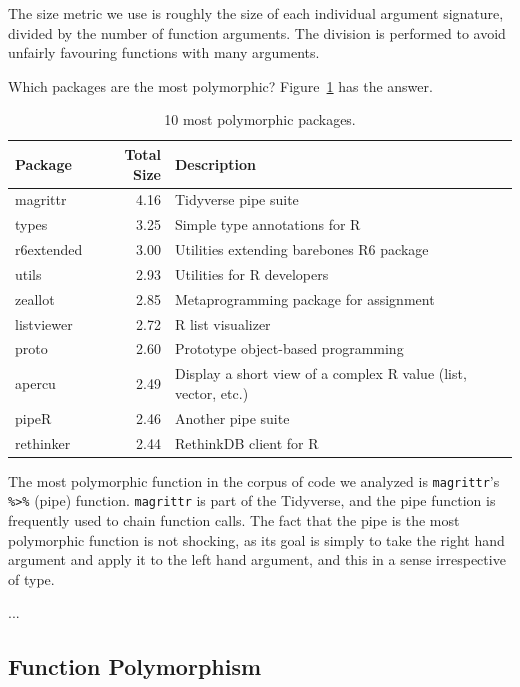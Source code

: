 \documentclass[acmsmall,10pt,review,anonymous]{acmart}\settopmatter{printfolios=true,printccs=false,printacmref=false}
\begin{document}
The size metric we use is roughly the size of each individual argument signature, divided by the number of function arguments.
The division is performed to avoid unfairly favouring functions with many arguments.

Which packages are the most polymorphic?
Figure~\ref{tab:packagepolysize} has the answer.

\begin{table}[ht]
\label{tab:packagepolysize}
\centering
\begin{tabular}{lrl}
  \hline
Package & Total Size & Description \\ 
  \hline
  magrittr & 4.16 & Tidyverse pipe suite \\ 
  types & 3.25 & Simple type annotations for R \\ 
  r6extended & 3.00 & Utilities extending barebones R6 package \\ 
  utils & 2.93 & Utilities for R developers \\ 
  zeallot & 2.85 & Metaprogramming package for assignment \\ 
  listviewer & 2.72 & R list visualizer \\ 
  proto & 2.60 & Prototype object-based programming \\ 
  apercu & 2.49 & Display a short view of a complex R value (list, vector, etc.) \\ 
  pipeR & 2.46 & Another pipe suite \\ 
  rethinker & 2.44 & RethinkDB client for R \\ 
   \hline
\end{tabular}
\caption{10 most polymorphic packages.}
\end{table}




The most polymorphic function in the corpus of code we analyzed is {\tt magrittr}'s {\tt \%>\%} (pipe) function.
{\tt magrittr} is part of the Tidyverse, and the pipe function is frequently used to chain function calls.
The fact that the pipe is the most polymorphic function is not shocking, as its goal is simply to take the right hand argument and apply it to the left hand argument, and this in a sense irrespective of type.

...

%
%
%
%
\subsection{Function Polymorphism}
\end{document}

